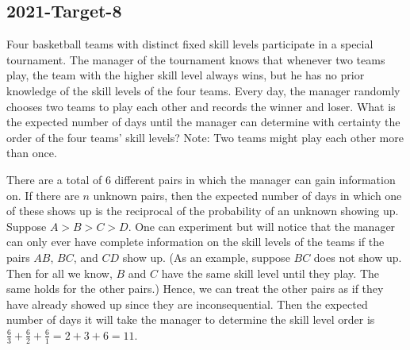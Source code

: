 \documentclass[12pt]{article}
\begin{document}
\subsection*{2021-Target-8}
Four basketball teams with distinct fixed skill levels participate in a special tournament. The manager of the tournament knows that whenever two teams play, the team with the higher skill level always wins, but he has no prior knowledge of the skill levels of the four teams. Every day, the manager randomly chooses two teams to play each other and records the winner and loser. What is the expected number of days until the manager can determine with certainty the order of the four teams' skill levels? Note: Two teams might play each other more than once.
\begin{answer}
There are a total of $6$ different pairs in which the manager can gain information on. If there are $n$ unknown pairs, then the expected number of days in which one of these shows up is the reciprocal of the probability of an unknown showing up. Suppose $A > B > C > D$. One can experiment but will notice that the manager can only ever have complete information on the skill levels of the teams if the pairs $AB$, $BC$, and $CD$ show up. (As an example, suppose $BC$ does not show up. Then for all we know, $B$ and $C$ have the same skill level until they play. The same holds for the other pairs.) Hence, we can treat the other pairs as if they have already showed up since they are inconsequential. Then the expected number of days it will take the manager to determine the skill level order is $\frac{6}{3}+\frac{6}{2}+\frac{6}{1} = 2+3+6 = \boxed{11}$.
\end{answer}
\end{document}
